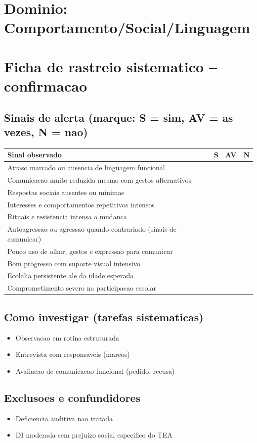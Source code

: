 \documentclass[a4paper,11pt]{book}
\begin{document}
\section*{Dominio: Comportamento/Social/Linguagem}
\section*{Ficha de rastreio sistematico -- confirmacao}
\subsection*{Sinais de alerta (marque: S = sim, AV = as vezes, N = nao)}
\begin{tabular}{@{}p{11.5cm}ccc@{}}\toprule
Sinal observado & S & AV & N \\\midrule
Atraso marcado ou ausencia de linguagem funcional & & & \\
Comunicacao muito reduzida mesmo com gestos alternativos & & & \\
Respostas sociais ausentes ou minimas & & & \\
Interesses e comportamentos repetitivos intensos & & & \\
Rituais e resistencia intensa a mudanca & & & \\
Autoagressao ou agressao quando contrariado (sinais de comunicar) & & & \\
Pouco uso de olhar, gestos e expressao para comunicar & & & \\
Bom progresso com suporte visual intensivo & & & \\
Ecolalia persistente ale da idade esperada & & & \\
Comprometimento severo na participacao escolar & & & \\
\bottomrule\end{tabular}
\subsection*{Como investigar (tarefas sistematicas)}
\begin{itemize}
\item Observacao em rotina estruturada
\item Entrevista com responsaveis (marcos)
\item Avaliacao de comunicacao funcional (pedido, recusa)
\end{itemize}
\subsection*{Exclusoes e confundidores}
\begin{itemize}
\item Deficiencia auditiva nao tratada
\item DI moderada sem prejuizo social especifico do TEA
\end{itemize}
\end{document}
